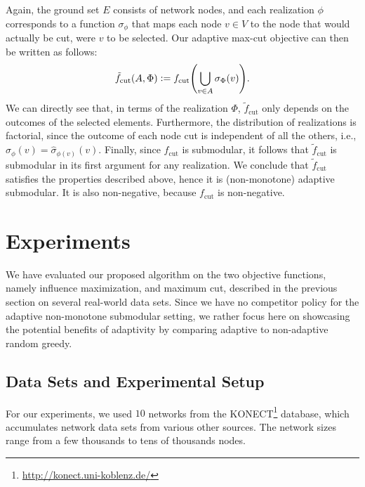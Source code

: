 \documentclass{article}
\newcommand{\defeq}{\vcentcolon=}
\let\originalleft\left
\let\originalright\right
\renewcommand{\left}{\mathopen{}\mathclose\bgroup\originalleft}
\renewcommand{\right}{\aftergroup\egroup\originalright}
\begin{document}
Again, the ground set $E$ consists of network nodes, and each realization $\phi$ corresponds to a function $\sigma_{\phi}$ that maps each node $v \in V$ to the node that would actually be cut, were $v$ to be selected.
Our adaptive max-cut objective can then be written as follows:
\begin{align*}
  \tilde{f}_{\textrm{cut}}(A, \Phi) \defeq f_{\textrm{cut}}\left(\bigcup_{v \in A}\sigma_{\Phi}(v)\right).
\end{align*}
We can directly see that, in terms of the realization $\Phi$, $\tilde{f}_{\textrm{cut}}$ only depends on the outcomes of the selected elements.
Furthermore, the distribution of realizations is factorial, since the outcome of each node cut is independent of all the others, i.e., $\sigma_{\phi}(v) = \hat{\sigma}_{\phi(v)}(v)$.
Finally, since $f_{\textrm{cut}}$ is submodular, it follows that $\tilde{f}_{\textrm{cut}}$ is submodular in its first argument for any realization.
We conclude that $\tilde{f}_{\textrm{cut}}$ satisfies the properties described above, hence it is (non-monotone) adaptive submodular.
It is also non-negative, because $f_{\textrm{cut}}$ is non-negative.

\section{Experiments}
We have evaluated our proposed algorithm on the two objective functions, namely influence maximization, and maximum cut, described in the previous section on several real-world data sets.
Since we have no competitor policy for the adaptive non-monotone submodular setting, we rather focus here on showcasing the potential benefits of adaptivity by comparing adaptive to non-adaptive random greedy.

\subsection{Data Sets and Experimental Setup}
For our experiments, we used $10$ networks from the KONECT\footnote{\url{http://konect.uni-koblenz.de/}} database, which accumulates network data sets from various other sources.
The network sizes range from a few thousands to tens of thousands nodes.
\end{document}
